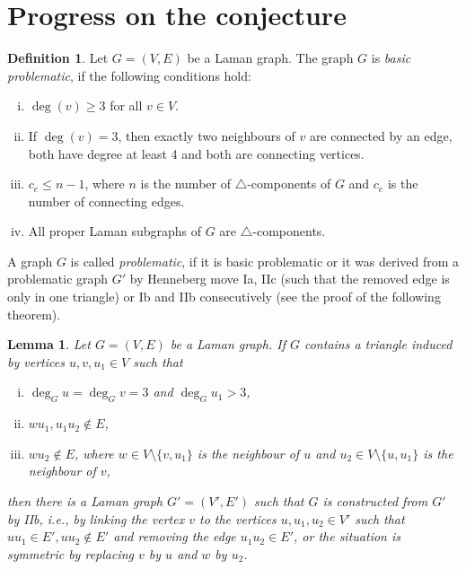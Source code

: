 \documentclass[a4paper, 11pt]{article}
\newcommand{\trcomps}{$\triangle$-components}
\newtheorem{lem}[thm]{Lemma}
\theoremstyle{definition}
\newtheorem{defn}{Definition}[section]
\begin{document}
\section{Progress on the conjecture}
\begin{defn}
Let $G=(V,E)$ be a Laman graph. The graph $G$ is \textit{basic problematic}, if the following conditions hold:
\begin{enumerate}[i)]
	\item $\deg(v)\geq 3$ for all $v\in V$.
	\item If $\deg(v) =3$, then exactly two neighbours of $v$ are connected by an edge, both have degree at least 4 and both are connecting vertices.
	\item $c_e\leq n-1$, where $n$ is the number of \trcomps{} of $G$ and $c_e$ is the number of connecting edges.
	\item All proper Laman subgraphs of $G$ are \trcomps{}.
\end{enumerate}
A graph $G$ is called \emph{problematic}, if it is basic problematic or it was derived from a problematic graph $G'$ by Henneberg move Ia, IIc (such that the removed edge is only in one triangle) or Ib and IIb consecutively (see the proof of the following theorem).
\end{defn}

\begin{lem}
\label{lem:undoIIb}
Let $G=(V,E)$ be a Laman graph. If $G$ contains a triangle induced by vertices $u,v, u_1\in V$ such that
\begin{enumerate}[i)]
\item $\deg_G u =\deg_G v=3$ and $\deg_G u_1>3$,
\item $wu_1,u_1u_2\notin E$,
\item $wu_2\notin E$, where $w\in V\setminus \{v, u_1\}$ is the neighbour of $u$ and $u_2\in V\setminus \{u, u_1\}$ is the neighbour of $v$,
\end{enumerate}
then there is a Laman graph $G'=(V',E')$ such that $G$ is constructed from $G'$ by IIb, i.e., by linking the vertex $v$  to the vertices $u,u_1,u_2 \in V'$ such that $uu_1\in E',uu_2\notin E'$ and removing the edge $u_1u_2\in E'$, or the situation is symmetric by replacing $v$ by $u$ and $w$ by $u_2$. 
\end{lem}
\end{document}
